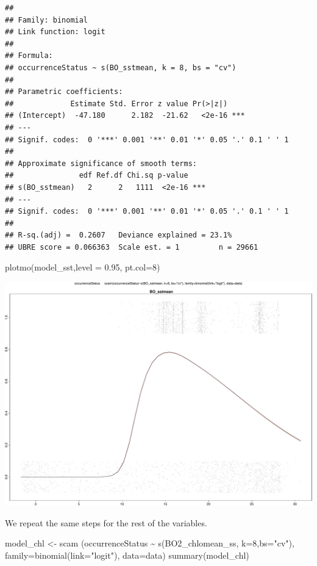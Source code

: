 \documentclass[
]{book}
\newenvironment{Shaded}{\begin{snugshade}}{\end{snugshade}}
\newcommand{\AttributeTok}[1]{\textcolor[rgb]{0.77,0.63,0.00}{#1}}
\newcommand{\DecValTok}[1]{\textcolor[rgb]{0.00,0.00,0.81}{#1}}
\newcommand{\FloatTok}[1]{\textcolor[rgb]{0.00,0.00,0.81}{#1}}
\newcommand{\FunctionTok}[1]{\textcolor[rgb]{0.00,0.00,0.00}{#1}}
\newcommand{\NormalTok}[1]{#1}
\newcommand{\OtherTok}[1]{\textcolor[rgb]{0.56,0.35,0.01}{#1}}
\newcommand{\SpecialCharTok}[1]{\textcolor[rgb]{0.00,0.00,0.00}{#1}}
\newcommand{\StringTok}[1]{\textcolor[rgb]{0.31,0.60,0.02}{#1}}
\begin{document}
\begin{verbatim}
## 
## Family: binomial 
## Link function: logit 
## 
## Formula:
## occurrenceStatus ~ s(BO_sstmean, k = 8, bs = "cv")
## 
## Parametric coefficients:
##             Estimate Std. Error z value Pr(>|z|)    
## (Intercept)  -47.180      2.182  -21.62   <2e-16 ***
## ---
## Signif. codes:  0 '***' 0.001 '**' 0.01 '*' 0.05 '.' 0.1 ' ' 1
## 
## Approximate significance of smooth terms:
##               edf Ref.df Chi.sq p-value    
## s(BO_sstmean)   2      2   1111  <2e-16 ***
## ---
## Signif. codes:  0 '***' 0.001 '**' 0.01 '*' 0.05 '.' 0.1 ' ' 1
## 
## R-sq.(adj) =  0.2607   Deviance explained = 23.1%
## UBRE score = 0.066363  Scale est. = 1         n = 29661
\end{verbatim}

\begin{Shaded}
\begin{Highlighting}[]
\FunctionTok{plotmo}\NormalTok{(model\_sst,}\AttributeTok{level =} \FloatTok{0.95}\NormalTok{, }\AttributeTok{pt.col=}\DecValTok{8}\NormalTok{)}
\end{Highlighting}
\end{Shaded}

\includegraphics{_main_files/figure-latex/unnamed-chunk-61-1.pdf}

We repeat the same steps for the rest of the variables.

\begin{Shaded}
\begin{Highlighting}[]
\NormalTok{model\_chl }\OtherTok{\textless{}{-}} \FunctionTok{scam}\NormalTok{ (occurrenceStatus }\SpecialCharTok{\textasciitilde{}}  \FunctionTok{s}\NormalTok{(BO2\_chlomean\_ss, }\AttributeTok{k=}\DecValTok{8}\NormalTok{,}\AttributeTok{bs=}\StringTok{"cv"}\NormalTok{), }\AttributeTok{family=}\FunctionTok{binomial}\NormalTok{(}\AttributeTok{link=}\StringTok{"logit"}\NormalTok{), }\AttributeTok{data=}\NormalTok{data)}
\FunctionTok{summary}\NormalTok{(model\_chl)}
\end{Highlighting}
\end{Shaded}
\end{document}
